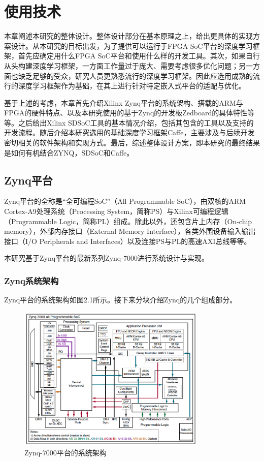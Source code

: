 
\chapter{使用技术}

本章阐述本研究的整体设计。整体设计部分在基本原理之上，给出更具体的实现方案设计。从本研究的目标出发，为了提供可以运行于FPGA SoC平台的深度学习框架，首先应确定用什么FPGA SoC平台和使用什么样的开发工具。其次，如果自行从头构建深度学习框架，一方面工作量过于庞大、需要考虑很多优化问题；另一方面也缺乏足够的受众，研究人员更熟悉流行的深度学习框架。因此应选用成熟的流行的深度学习框架作为基础，在其上进行针对特定嵌入式平台的适配与优化。

基于上述的考虑，本章首先介绍Xilinx Zynq平台的系统架构、搭载的ARM与FPGA的硬件特点、以及本研究使用的基于Zynq的开发板Zedboard的具体特性等等。之后给出Xilinx SDSoC工具的基本情况介绍，包括其包含的工具以及支持的开发流程。随后介绍本研究选用的基础深度学习框架Caffe，主要涉及与后续开发密切相关的软件架构和实现方式。最后，综述整体设计方案，即本研究的最终结果是如何有机结合ZYNQ，SDSoC和Caffe。

\section{Zynq平台}

Zynq平台的全称是“全可编程SoC”（All Programmable SoC），由双核的ARM Cortex-A9处理系统（Processing System，简称PS）与Xilinx可编程逻辑（Programmable Logic，简称PL）组成。除此以外，还包含片上内存（On-chip memory），外部内存接口（External Memory Interface），各类外围设备输入输出接口（I/O Peripherals and Interfaces）以及连接PS与PL的高速AXI总线等等。

本研究基于Zynq平台的最新系列Zynq-7000进行系统设计与实现。

\subsection{Zynq系统架构}

Zynq平台的系统架构如图2.1所示。接下来分块介绍Zynq的几个组成部分。

\begin{figure}[!ht]
\centering
	\includegraphics[width=0.8\textwidth]{assets/imgs/zynq-7000}
\caption{Zynq-7000平台的系统架构}
\end{figure}

